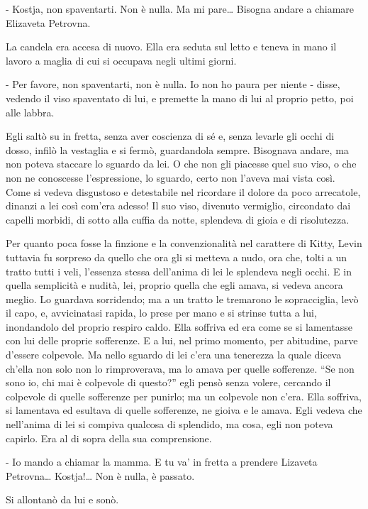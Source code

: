 - Kostja, non spaventarti. Non è nulla. Ma mi pare\ldots{} Bisogna andare a chiamare Elizaveta Petrovna. 

La candela era accesa di nuovo. Ella era seduta sul letto e teneva in mano il lavoro a maglia di cui si occupava negli ultimi giorni. 

- Per favore, non spaventarti, non è nulla. Io non ho paura per niente - disse, vedendo il viso spaventato di lui, e premette la mano di lui al proprio petto, poi alle labbra. 

Egli saltò su in fretta, senza aver coscienza di sé e, senza levarle gli occhi di dosso, infilò la vestaglia e si fermò, guardandola sempre. Bisognava andare, ma non poteva staccare lo sguardo da lei. O che non gli piacesse quel suo viso, o che non ne conoscesse l'espressione, lo sguardo, certo non l'aveva mai vista così. Come si vedeva disgustoso e detestabile nel ricordare il dolore da poco arrecatole, dinanzi a lei così com'era adesso! Il suo viso, divenuto vermiglio, circondato dai capelli morbidi, di sotto alla cuffia da notte, splendeva di gioia e di risolutezza. 

Per quanto poca fosse la finzione e la convenzionalità nel carattere di Kitty, Levin tuttavia fu sorpreso da quello che ora gli si metteva a nudo, ora che, tolti a un tratto tutti i veli, l'essenza stessa dell'anima di lei le splendeva negli occhi. E in quella semplicità e nudità, lei, proprio quella che egli amava, si vedeva ancora meglio. Lo guardava sorridendo; ma a un tratto le tremarono le sopracciglia, levò il capo, e, avvicinatasi rapida, lo prese per mano e si strinse tutta a lui, inondandolo del proprio respiro caldo. Ella soffriva ed era come se si lamentasse con lui delle proprie sofferenze. E a lui, nel primo momento, per abitudine, parve d'essere colpevole. Ma nello sguardo di lei c'era una tenerezza la quale diceva ch'ella non solo non lo rimproverava, ma lo amava per quelle sofferenze. ``Se non sono io, chi mai è colpevole di questo?'' egli pensò senza volere, cercando il colpevole di quelle sofferenze per punirlo; ma un colpevole non c'era. Ella soffriva, si lamentava ed esultava di quelle sofferenze, ne gioiva e le amava. Egli vedeva che nell'anima di lei si compiva qualcosa di splendido, ma cosa, egli non poteva capirlo. Era al di sopra della sua comprensione. 

- Io mando a chiamar la mamma. E tu va' in fretta a prendere Lizaveta Petrovna\ldots{} Kostja!\ldots{} Non è nulla, è passato. 

Si allontanò da lui e sonò. 

